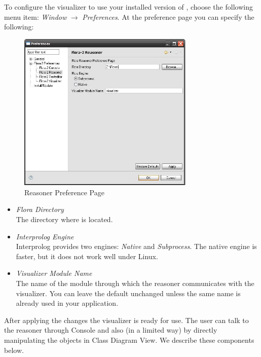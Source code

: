 To configure the visualizer to use your installed version of \FLORA,
choose the following menu item:
\emph{Window} $\rightarrow$ \emph{Preferences}.
At the preference page you can specify the following:

\begin{figure}[tbh]
	\centering
		\includegraphics[width=0.75\textwidth]{preferencepage_reasoner}
	\caption{\FLORA Reasoner Preference Page}
	\label{fig:preferencepage_reasoner}
\end{figure}

\begin{itemize}
\item \emph{Flora Directory}  \\
  The directory where \FLORA is located.

\item \emph{Interprolog Engine}  \\
  Interprolog provides two engines: \emph{Native} and \emph{Subprocess}.
  The native engine is faster, but it does not work well under Linux.

\item \emph{Visualizer Module Name}\\
  The name of the \FLORA module through which the reasoner communicates
  with the visualizer. You can leave the default unchanged unless the same
  name is already used in your \FLORA application.
\end{itemize}

After applying the changes the visualizer
is ready for use. The user can talk to the \FLORA reasoner through
\FVIZ Console and also (in a limited way) by directly manipulating the
objects in \FVIZ  Class Diagram View. We describe these components below.

